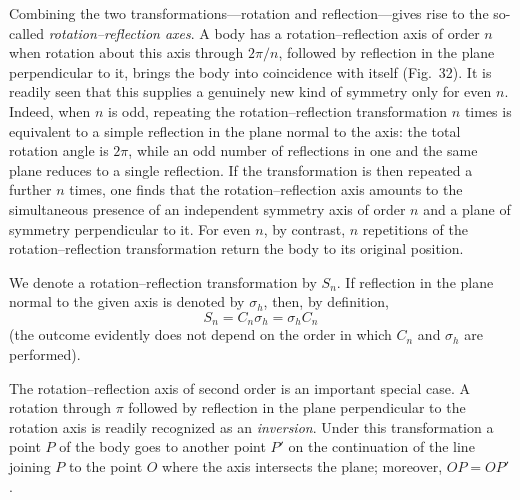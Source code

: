 Combining the two transformations---rotation and reflection---gives rise to the so-called \emph{rotation--reflection axes}. A body has a rotation--reflection axis of order $n$ when rotation about this axis through $2\pi/n$, followed by reflection in the plane perpendicular to it, brings the body into coincidence with itself (Fig.~32). It is readily seen that this supplies a genuinely new kind of symmetry only for even $n$. Indeed, when $n$ is odd, repeating the rotation--reflection transformation $n$ times is equivalent to a simple reflection in the plane normal to the axis: the total rotation angle is $2\pi$, while an odd number of reflections in one and the same plane reduces to a single reflection. If the transformation is then repeated a further $n$ times, one finds that the rotation--reflection axis amounts to the simultaneous presence of an independent symmetry axis of order $n$ and a plane of symmetry perpendicular to it. For even $n$, by contrast, $n$ repetitions of the rotation--reflection transformation return the body to its original position.

\begin{figure}[ht]
\centering
{}
\caption{}
\label{fig:91-32}
\end{figure}

We denote a rotation--reflection transformation by $S_n$. If reflection in the plane normal to the given axis is denoted by $\sigma_h$, then, by definition,
\begin{equation}
S_n=C_n\sigma_h=\sigma_hC_n
\tag{91.4}
\end{equation}
(the outcome evidently does not depend on the order in which $C_n$ and $\sigma_h$ are performed).

The rotation--reflection axis of second order is an important special case. A rotation through $\pi$ followed by reflection in the plane perpendicular to the rotation axis is readily recognized as an \emph{inversion}. Under this transformation a point $P$ of the body goes to another point $P'$ on the continuation of the line joining $P$ to the point $O$ where the axis intersects the plane; moreover, $OP=OP'$.


